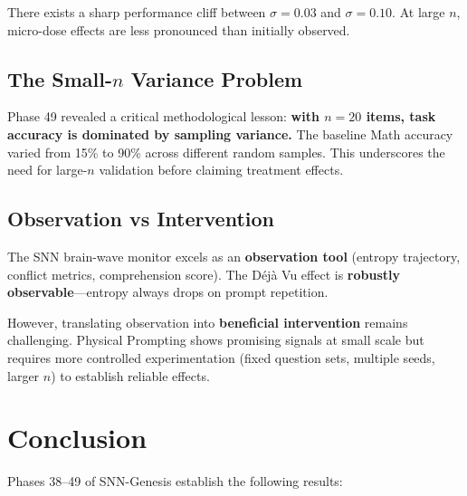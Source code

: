 \documentclass[11pt,a4paper]{article}
\begin{document}
There exists a sharp performance cliff between $\sigma=0.03$ and $\sigma=0.10$.
At large $n$, micro-dose effects are less pronounced than initially observed.

\subsection{The Small-$n$ Variance Problem}

Phase 49 revealed a critical methodological lesson: \textbf{with $n=20$ items,
task accuracy is dominated by sampling variance.} The baseline Math accuracy
varied from 15\% to 90\% across different random samples. This underscores
the need for large-$n$ validation before claiming treatment effects.

\subsection{Observation vs Intervention}

The SNN brain-wave monitor excels as an \textbf{observation tool}
(entropy trajectory, conflict metrics, comprehension score). The D\'{e}j\`{a} Vu
effect is \textbf{robustly observable}---entropy always drops on prompt repetition.

However, translating observation into \textbf{beneficial intervention} remains
challenging. Physical Prompting shows promising signals at small scale but
requires more controlled experimentation (fixed question sets, multiple seeds,
larger $n$) to establish reliable effects.

\section{Conclusion}

Phases 38--49 of SNN-Genesis establish the following results:
\end{document}
